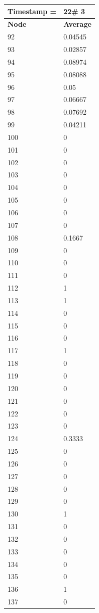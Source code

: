 \begin{tabular}{|l||l|}
\hline
\textbf{Timestamp =} & \textbf{22}\# 3\\\hline
	\textbf{Node} & \textbf{Average} \\ \hline
\hline
	92 & 0.04545 \\ \hline
	93 & 0.02857 \\ \hline
	94 & 0.08974 \\ \hline
	95 & 0.08088 \\ \hline
	96 & 0.05 \\ \hline
	97 & 0.06667 \\ \hline
	98 & 0.07692 \\ \hline
	99 & 0.04211 \\ \hline
	100 & 0 \\ \hline
	101 & 0 \\ \hline
	102 & 0 \\ \hline
	103 & 0 \\ \hline
	104 & 0 \\ \hline
	105 & 0 \\ \hline
	106 & 0 \\ \hline
	107 & 0 \\ \hline
	108 & 0.1667 \\ \hline
	109 & 0 \\ \hline
	110 & 0 \\ \hline
	111 & 0 \\ \hline
	112 & 1 \\ \hline
	113 & 1 \\ \hline
	114 & 0 \\ \hline
	115 & 0 \\ \hline
	116 & 0 \\ \hline
	117 & 1 \\ \hline
	118 & 0 \\ \hline
	119 & 0 \\ \hline
	120 & 0 \\ \hline
	121 & 0 \\ \hline
	122 & 0 \\ \hline
	123 & 0 \\ \hline
	124 & 0.3333 \\ \hline
	125 & 0 \\ \hline
	126 & 0 \\ \hline
	127 & 0 \\ \hline
	128 & 0 \\ \hline
	129 & 0 \\ \hline
	130 & 1 \\ \hline
	131 & 0 \\ \hline
	132 & 0 \\ \hline
	133 & 0 \\ \hline
	134 & 0 \\ \hline
	135 & 0 \\ \hline
	136 & 1 \\ \hline
	137 & 0 \\ \hline
\end{tabular}

